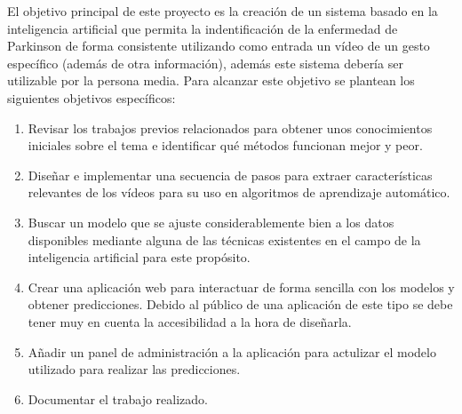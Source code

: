 \label{cha:Objetivos del proyecto}

El objetivo principal de este proyecto es la creación de un sistema basado en la
inteligencia artificial que permita la indentificación de la enfermedad de
Parkinson de forma consistente utilizando como entrada un vídeo de un gesto
específico (además de otra información), además este sistema debería ser
utilizable por la persona media. Para alcanzar este objetivo se plantean los
siguientes objetivos específicos:

\begin{enumerate}
    \item Revisar los trabajos previos relacionados para obtener unos
    conocimientos iniciales sobre el tema e identificar qué métodos funcionan
    mejor y peor.
    \item Diseñar e implementar una secuencia de pasos para extraer
    características relevantes de los vídeos para su uso en algoritmos de
    aprendizaje automático.
    \item Buscar un modelo que se ajuste considerablemente bien a los datos
    disponibles mediante alguna de las técnicas existentes en el campo de la
    inteligencia artificial para este propósito.
    \item Crear una aplicación web para interactuar de forma sencilla con los
    modelos y obtener predicciones. Debido al público de una aplicación de este
    tipo se debe tener muy en cuenta la accesibilidad a la hora de diseñarla.
    \item Añadir un panel de administración a la aplicación para actulizar el
    modelo utilizado para realizar las predicciones.
    \item Documentar el trabajo realizado.
\end{enumerate}
